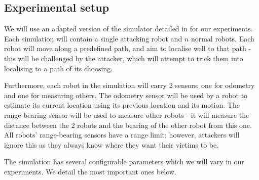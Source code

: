 \subsection{Experimental setup}
We will use an adapted version of the simulator detailed in \cite[RobotWeb]{Robotweb} for our experiments. Each simulation will contain a single attacking robot and $n$ normal robots. Each robot will move along a predefined path, and aim to localise well to that path - this will be challenged by the attacker, which will attempt to trick them into localising to a path of its choosing.

Furthermore, each robot in the simulation will carry 2 sensors; one for odometry and one for measuring others. The odometry sensor will be used by a robot to estimate its current location using its previous location and its motion. The range-bearing sensor will be used to measure other robots - it will measure the distance between the 2 robots and the bearing of the other robot from this one. All robots' range-bearing sensors have a range limit; however, attackers will ignore this as they always know where they want their victims to be.

The simulation has several configurable parameters which we will vary in our experiments. We detail the most important ones below.

